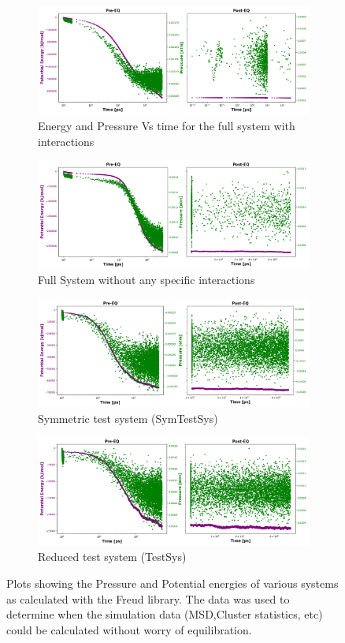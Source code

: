 \documentclass[draft, english]{volcanica-template}
\begin{document}
\begin{figure}[!htbp]
\centering
\begin{figure}[!htbp]
\centering
\includegraphics[width=0.7\linewidth]{files/EQ_stats-2e2410cf19551a48a5a7d060bb1cb330.png}
\caption[]{Energy and Pressure Vs time for the full system with interactions}
\label{Fig3_EQ}
\end{figure}

\begin{figure}[!htbp]
\centering
\includegraphics[width=0.7\linewidth]{files/EQ_stats-d94c66ce8d73889e33338bbdaaae0c3a.png}
\caption[]{Full System without any specific interactions}
\label{Fig3_EQ-b}
\end{figure}

\begin{figure}[!htbp]
\centering
\includegraphics[width=0.7\linewidth]{files/EQ_stats-dab4b4a52a7e236a63d37ef97c374df1.png}
\caption[]{Symmetric test system (SymTestSys)}
\label{Fig3_EQ-c}
\end{figure}

\begin{figure}[!htbp]
\centering
\includegraphics[width=0.7\linewidth]{files/EQ_stats-113631f66a89c9f748cb88ded108ae59.png}
\caption[]{Reduced test system (TestSys)}
\label{Fig3_EQ-d}
\end{figure}
\caption[]{Plots showing the Pressure and Potential energies of various systems as calculated with the Freud library. The data was used to determine when the simulation data (MSD,Cluster statistics, etc) could be calculated without worry of equilibration.}
\label{Fig3_EQ-d}
\end{figure}
\end{document}

